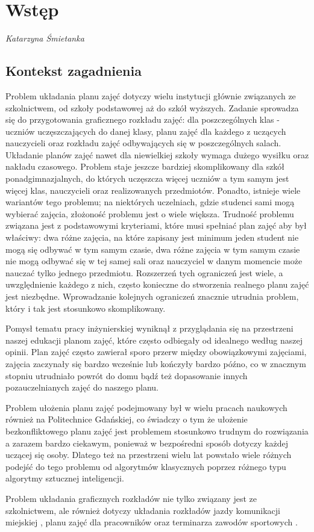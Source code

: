 
\chapter{Wstęp}
\textit{Katarzyna Śmietanka}
\section{Kontekst zagadnienia}

\par Problem układania planu zajęć dotyczy wielu instytucji głównie związanych ze szkolnictwem, od szkoły podstawowej aż do szkół wyższych. Zadanie sprowadza się do przygotowania graficznego rozkładu zajęć: dla poszczególnych klas - uczniów uczęszczających do danej klasy, planu zajęć dla każdego z uczących nauczycieli oraz rozkładu zajęć odbywających się w poszczególnych salach. Układanie planów zajęć nawet dla niewielkiej szkoły wymaga dużego wysiłku oraz nakładu czasowego. Problem staje jeszcze bardziej skomplikowany dla szkół ponadgimnazjalnych, do których uczęszcza więcej uczniów a tym samym jest więcej klas, nauczycieli oraz realizowanych przedmiotów. Ponadto, istnieje wiele wariantów tego problemu; na niektórych uczelniach, gdzie studenci sami mogą wybierać zajęcia, złożoność problemu jest o wiele większa. Trudność problemu związana jest z podstawowymi kryteriami, które musi spełniać plan zajęć aby był właściwy: dwa różne zajęcia, na które zapisany jest minimum jeden student nie mogą się odbywać w tym samym czasie, dwa różne zajęcia w tym samym czasie nie mogą odbywać się w tej samej sali oraz nauczyciel w danym momencie może nauczać tylko jednego przedmiotu. Rozszerzeń tych ograniczeń jest wiele, a uwzględnienie każdego z nich, często konieczne do stworzenia realnego planu zajęć jest niezbędne. Wprowadzanie kolejnych ograniczeń znacznie utrudnia problem, który i tak jest stosunkowo skomplikowany.
\par Pomysł tematu pracy inżynierskiej wyniknął z przyglądania się na przestrzeni naszej edukacji planom zajęć, które często odbiegały od idealnego według naszej opinii. Plan zajęć często zawierał sporo przerw między obowiązkowymi zajęciami, zajęcia zaczynały się bardzo wcześnie lub kończyły bardzo późno, co w znacznym stopniu utrudniało powrót do domu bądź też dopasowanie innych pozauczelnianych zajęć do naszego planu.
\par Problem ułożenia planu zajęć podejmowany był w wielu pracach naukowych również na Politechnice Gdańskiej, co świadczy o tym że ułożenie bezkonfliktowego planu zajęć jest problemem stosunkowo trudnym do rozwiązania a zarazem bardzo ciekawym, ponieważ w bezpośredni sposób dotyczy każdej uczącej się osoby. Dlatego też na przestrzeni wielu lat powstało wiele różnych podejść do tego problemu od algorytmów klasycznych poprzez różnego typu algorytmy sztucznej inteligencji.
\par Problem układania graficznych rozkładów nie tylko związany jest ze szkolnictwem, ale również dotyczy układania rozkładów jazdy komunikacji miejskiej \cite{com}, planu zajęć dla pracowników \cite{worker} oraz terminarza zawodów sportowych \cite{sport}.
